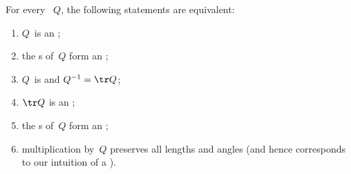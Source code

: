 \begin{theorem} \label{thm:orthog}
For every ~\(Q\),  the following statements are equivalent:
\begin{enumerate}
\item\label{thm:orthog:0} \(Q\)~is an ;
\item\label{thm:orthog:ii} the s of~\(Q\) form an ; 
\item\label{thm:orthog:i} \(Q\)~is  and \(Q^{-1}=\tr Q\);
\item\label{thm:orthog:ia} \(\tr Q\) is an ;
\item\label{thm:orthog:iii} the s of~\(Q\) form an ;
\item\label{thm:orthog:iv} multiplication by~\(Q\) preserves all lengths and angles (and hence corresponds to our intuition of a ).
\end{enumerate}
\end{theorem}

